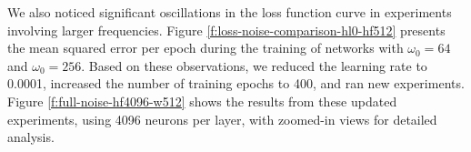 
We also noticed significant oscillations in the loss function curve in experiments involving larger frequencies. Figure \ref{f:loss-noise-comparison-hl0-hf512} presents the mean squared error per epoch during the training of networks with $\omega_0=64$ and $\omega_0=256$. Based on these observations, we reduced the learning rate to 0.0001, increased the number of training epochs to 400, and ran new experiments. Figure \ref{f:full-noise-hf4096-w512} shows the results from these updated experiments, using 4096 neurons per layer, with zoomed-in views for detailed analysis.


